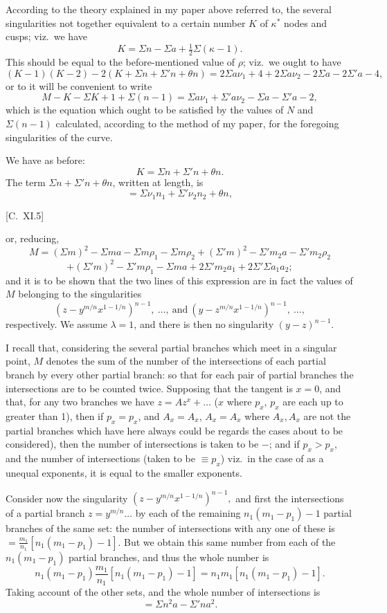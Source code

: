\documentclass[12pt,a4paper,oneside]{book}
\newcommand{\paperref}[1]{\par\noindent\hfill[#1]\hfill\null\par}
\theoremstyle{plain}
\theoremstyle{definition}
\theoremstyle{remark}
\begin{document}
According to the theory explained in my paper above referred to, the several singularities not together equivalent to a certain number $K$ of $\kappa^*$ nodes and cusps; viz.\ we have
\[
K=\Sigma n-\Sigma a+\tfrac{1}{2}\Sigma(\kappa-1).
\]
This should be equal to the before-mentioned value of $\rho$; viz.\ we ought to have
\[
(K-1)(K-2)-2(K+\Sigma n+\Sigma'n+\theta n)=2\Sigma a\nu_1+4+2\Sigma a\nu_2-2\Sigma a-2\Sigma'a-4,
\]
or to it will be convenient to write
\[
M-K-\Sigma K+1+\Sigma(n-1)=\Sigma a\nu_1+\Sigma'a\nu_2-\Sigma a-\Sigma'a-2,
\]
which is the equation which ought to be satisfied by the values of $N$ and $\Sigma(n-1)$ calculated, according to the method of my paper, for the foregoing singularities of the curve.

We have as before:
\[
K=\Sigma n+\Sigma'n+\theta n.
\]
The term $\Sigma n+\Sigma'n+\theta n$, written at length, is
\[
=\Sigma\nu_1n_1+\Sigma'\nu_2n_2+\theta n,
\]
\paperref{C.~XI.\hfill 5}

\newpage
or, reducing,
\[
M=(\Sigma m)^2-\Sigma m a-\Sigma m \rho_1-\Sigma m \rho_2+(\Sigma' m)^2-\Sigma' m_2 a-\Sigma' m_2 \rho_2
\]
\[
+(\Sigma' m)^2-\Sigma' m\rho_1-\Sigma m a+2\Sigma' m_2 a_1+2\Sigma'\Sigma a_1 a_2;
\]
and it is to be shown that the two lines of this expression are in fact the values of $M$ belonging to the singularities
\[
\left(z-y^{m/n}x^{1-1/n}\right)^{n-1},\ \dots,\ \text{and}\ \left(y-z^{m/n}x^{1-1/n}\right)^{n-1},\ \dots,
\]
respectively. We assume $\lambda=1$, and there is then no singularity $\left(y-z\right)^{n-1}$.

I recall that, considering the several partial branches which meet in a singular point, $M$ denotes the sum of the number of the intersections of each partial branch by every other partial branch: so that for each pair of partial branches the intersections are to be counted twice. Supposing that the tangent is $x=0$, and that, for any two branches we have $z=Az^x+\dots$ ($x$ where $p_x$, $p_x$ are each up to greater than 1), then if $p_x=p_x$, and $A_x=A_x$, $A_x=A_x$ where $A_x, A_x$ are not the partial branches which have here always could be regards the cases about to be considered), then the number of intersections is taken to be $-$; and if $p_x>p_x$, and the number of intersections (taken to be $\equiv p_x$) viz.\ in the case of as a unequal exponents, it is equal to the smaller exponents.

Consider now the singularity $\left(z-y^{m/n}x^{1-1/n}\right)^{n-1},$ and first the intersections of a partial branch $z=y^{m/n}\dots$ by each of the remaining $n_1(m_1-p_1)-1$ partial branches of the same set: the number of intersections with any one of these is $=\frac{m_1}{n_1}\left[n_1(m_1-p_1)-1\right]$. But we obtain this same number from each of the $n_1(m_1-p_1)$ partial branches, and thus the whole number is
\[
n_1\left(m_1-p_1\right)\frac{m_1}{n_1}\left[n_1(m_1-p_1)-1\right]=n_1m_1\left[n_1(m_1-p_1)-1\right].
\]
Taking account of the other sets, and the whole number of intersections is
\[
=\Sigma n^2 a-\Sigma' n a^2.
\]
\end{document}
